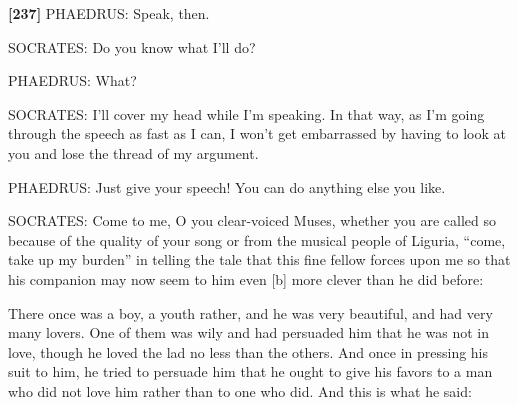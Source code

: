 {\bf {[}237{]}} PHAEDRUS: Speak, then.

SOCRATES: Do you know what I'll do?

PHAEDRUS: What?

SOCRATES: I'll cover my head while I'm speaking. In that way, as I'm
going through the speech as fast as I can, I won't get embarrassed by
having to look at you and lose the thread of my argument.

PHAEDRUS: Just give your speech! You can do anything else you like.

SOCRATES: Come to me, O you clear-voiced Muses, whether you are called
so because of the quality of your song or from the musical people of
Liguria, “come, take
up my burden” in telling the tale that this fine fellow forces upon me
so that his companion may now seem to him even {[}b{]} more clever than
he did before:

There once was a boy, a youth rather, and he was very beautiful, and had
very many lovers. One of them was wily and had persuaded him that he was
not in love, though he loved the lad no less than the others. And once
in pressing his suit to him, he tried to persuade him that he ought to
give his favors to a man who did not love him rather than to one who
did. And this is what he said:

